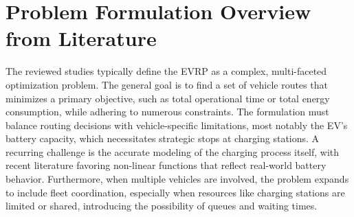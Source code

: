 \section{Problem Formulation Overview from Literature}
The reviewed studies typically define the EVRP as a complex, multi-faceted optimization problem. The general goal is to find a set of vehicle routes that minimizes a primary objective, such as total operational time or total energy consumption, while adhering to numerous constraints. The formulation must balance routing decisions with vehicle-specific limitations, most notably the EV's battery capacity, which necessitates strategic stops at charging stations. A recurring challenge is the accurate modeling of the charging process itself, with recent literature favoring non-linear functions that reflect real-world battery behavior. Furthermore, when multiple vehicles are involved, the problem expands to include fleet coordination, especially when resources like charging stations are limited or shared, introducing the possibility of queues and waiting times.
